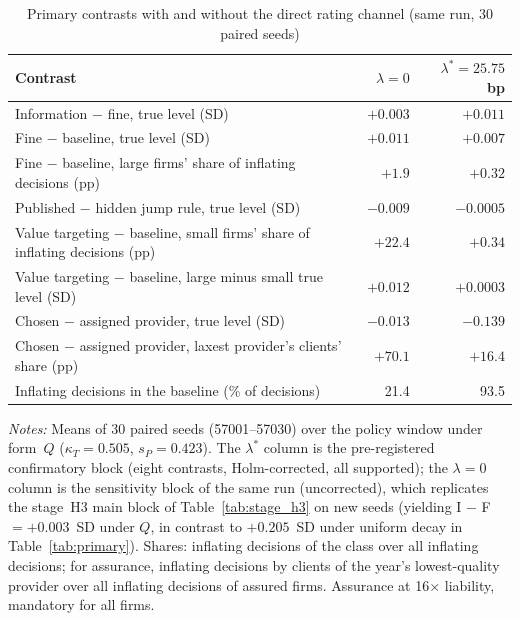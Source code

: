 \documentclass[11pt]{article}
\begin{document}
\begin{table}[h]
\centering
\small
\begin{threeparttable}
\caption{Primary contrasts with and without the direct rating channel (same run, 30 paired seeds)}
\label{tab:financing}
\begin{tabular}{@{}lrr@{}}
\toprule
Contrast & $\lambda = 0$ & $\lambda^* = 25.75$ bp \\
\midrule
Information $-$ fine, true level (SD) & $+0.003$ & $+0.011$ \\
Fine $-$ baseline, true level (SD) & $+0.011$ & $+0.007$ \\
Fine $-$ baseline, large firms' share of inflating decisions (pp) & $+1.9$ & $+0.32$ \\
Published $-$ hidden jump rule, true level (SD) & $-0.009$ & $-0.0005$ \\
Value targeting $-$ baseline, small firms' share of inflating decisions (pp) & $+22.4$ & $+0.34$ \\
Value targeting $-$ baseline, large minus small true level (SD) & $+0.012$ & $+0.0003$ \\
Chosen $-$ assigned provider, true level (SD) & $-0.013$ & $-0.139$ \\
Chosen $-$ assigned provider, laxest provider's clients' share (pp) & $+70.1$ & $+16.4$ \\
Inflating decisions in the baseline (\% of decisions) & 21.4 & 93.5 \\
\bottomrule
\end{tabular}
\begin{tablenotes}[flushleft]\footnotesize
\item \textit{Notes:} Means of 30 paired seeds (57001--57030) over the policy window under form~$Q$ ($\kappa_T = 0.505$, $s_P = 0.423$). The $\lambda^*$ column is the pre-registered confirmatory block (eight contrasts, Holm-corrected, all supported); the $\lambda = 0$ column is the sensitivity block of the same run (uncorrected), which replicates the stage~H3 main block of Table~\ref{tab:stage_h3} on new seeds (yielding I $-$ F $= +0.003$~SD under $Q$, in contrast to $+0.205$~SD under uniform decay in Table~\ref{tab:primary}). Shares: inflating decisions of the class over all inflating decisions; for assurance, inflating decisions by clients of the year's lowest-quality provider over all inflating decisions of assured firms. Assurance at 16$\times$ liability, mandatory for all firms.
\end{tablenotes}
\end{threeparttable}
\end{table}
\end{document}

